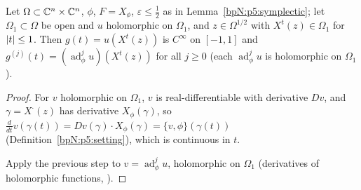 \begin{lemma}\label{bpN:p5:lie-derivative}
Let $\Omega\subset\mathbb{C}^n\times\mathbb{C}^n$, $\phi$, $F=X_\phi$, $\varepsilon\le\frac12$ as in Lemma~\ref{bpN:p5:symplectic}; let $\Omega_1\subset\Omega$ be open and $u$ holomorphic on $\Omega_1$, and $z\in\Omega^{1/2}$ with $X^t(z)\in\Omega_1$ for $\lvert t\rvert\le1$. Then $g(t)=u(X^t(z))$ is $C^\infty$ on $[-1,1]$ and
$g^{(j)}(t)=(\operatorname{ad}^j_\phi u)(X^t(z))$ for all $j\ge0$ (each $\operatorname{ad}^j_\phi u$ is holomorphic on $\Omega_1$).
\end{lemma}
\begin{proof}
\label{stepN:p5:ld-one} For $v$ holomorphic on $\Omega_1$, $v$ is real-differentiable with derivative $Dv$, and $\gamma=X^{\cdot}(z)$ has derivative $X_\phi(\gamma)$, so $\frac d{dt}v(\gamma(t))=Dv(\gamma)\cdot X_\phi(\gamma)=\{v,\phi\}(\gamma(t))$ (Definition~\ref{bpN:p5:setting}), which is continuous in $t$.

\label{stepN:p5:ld-ind} Apply the previous step to $v=\operatorname{ad}^{j}_\phi u$, holomorphic on $\Omega_1$ (derivatives of holomorphic functions, ).
\end{proof}

